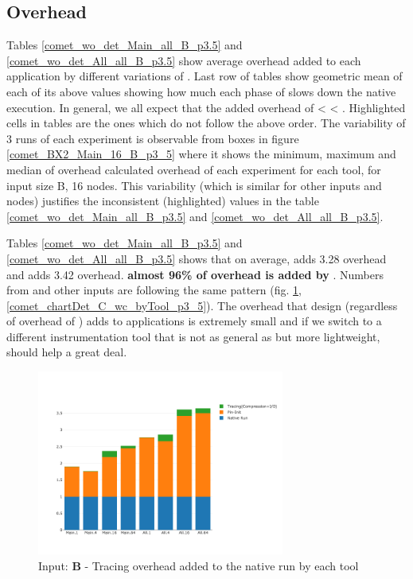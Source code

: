   
\subsection{ \pininit Overhead} 
\label{subsec:pinit}
Tables \ref{comet_wo_det_Main_all_B_p3.5} and \ref{comet_wo_det_All_all_B_p3.5} show average overhead added to each application by different variations of \parlot. Last row of tables show geometric mean of each of its above values showing how much each phase of \parlot slows down the native execution. In general, we all expect that the added overhead of  \pininit < \parlot < \parlotnc. Highlighted cells in tables are the ones which do not follow the above order. The variability of 3 runs of each experiment is observable from boxes in figure \ref{comet_BX2_Main_16_B_p3_5} where it shows the minimum, maximum and median of overhead calculated overhead of each experiment for each tool, for input size B, 16 nodes.
This variability (which is similar for other inputs and nodes) justifies the inconsistent (highlighted) values in the table \ref{comet_wo_det_Main_all_B_p3.5} and \ref{comet_wo_det_All_all_B_p3.5}.


Tables \ref{comet_wo_det_Main_all_B_p3.5} and \ref{comet_wo_det_All_all_B_p3.5} shows that on average, \pininit adds 3.28 overhead and \parlota adds 3.42 overhead. \textbf{almost 96\% of \parlota overhead is added by \pininit} . Numbers from \parlotm and other inputs are following the same pattern (fig. \ref{comet_chartDet_B_wc_byTool_p3_5},\ref{comet_chartDet_C_wc_byTool_p3_5}).
The overhead that \parlot design (regardless of overhead of \pininit) adds to applications is extremely small and if we switch to a different instrumentation tool that is not as general as \pin but more lightweight, should help a great deal. \\





\begin{figure}[!t]
\centering
\includegraphics[width=3.2in]{figs.comet.newMed/comet_chartDet_B_wc_byTool_p3_5.png}
\caption{ Input: \textbf{B} - Tracing overhead added to the native run by each tool}
\label{comet_chartDet_B_wc_byTool_p3_5}
\end{figure}


